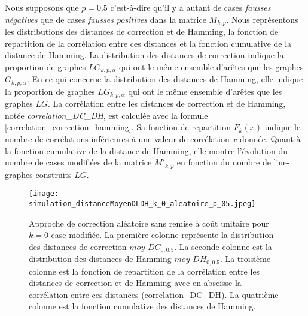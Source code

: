 

Nous supposons que $p=0.5$ c'est-\`a-dire qu'il y a autant de cases {\em fausses n\'egatives} que de cases {\em fausses positives} dans la matrice $M_{k,p}$.
\newline
Nous repr\'esentons les distributions des distances de correction et de Hamming, la fonction de repartition de la corr\'elation entre ces distances  et la fonction cumulative de la distance de Hamming. 
La distribution des distances de correction indique la proportion de graphes $LG_{k,p,\alpha}$ qui ont le m\^eme ensemble d'ar\^etes que les graphes $G_{k,p,\alpha}$. En ce qui concerne la distribution des distances de Hamming, elle indique  la proportion de graphes $LG_{k,p,\alpha}$ qui ont le m\^eme ensemble d'ar\^etes que les graphes $LG$.
La corr\'elation entre les distances de correction et de Hamming, not\'ee {\em correlation\_DC\_DH}, est calcul\'ee avec la formule \ref{correlation_correction_hamming}. Sa fonction de repartition $F_k(x)$ indique le nombre de corr\'elations inf\'erieures \`a une valeur de corr\'elation $x$ donn\'ee.
Quant \`a la fonction cumulative de la distance de Hamming, elle montre l'\'evolution du nombre de cases modifi\'ees de la matrice $M'_{k,p}$ en fonction du nombre de line-graphes  construits $LG$.
\newline
\begin{figure}[htb!] 
\centering
\texttt{[image: simulation\_distanceMoyenDLDH\_k\_0\_aleatoire\_p\_05.jpeg]}
\caption{ Approche de correction al\'eatoire sans remise \`a co\^ut unitaire pour $k =0 $ case modifi\'ee. La premi\`ere colonne repr\'esente la distribution des distances de correction $moy\_DC_{0,0.5}$. La seconde colonne est la distribution des distances de Hamming $moy\_DH_{0,0.5}$. La troisi\`eme colonne  est la fonction de repartition de la corr\'elation entre les distances de correction et de Hamming avec en abscisse la corr\'elation entre ces distances (correlation\_DC\_DH).  La quatri\`eme colonne est la fonction cumulative des distances de Hamming.}
\label{sansremise_unitaire_distanceMoyenDCDH_k_0_aleatoire_p_05} 
\end{figure}
\FloatBarrier

